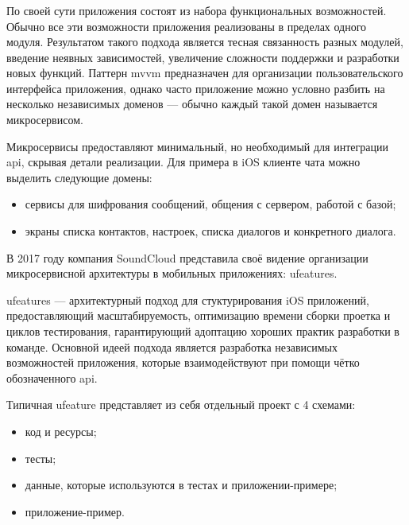 \subsubsection{}
\label{sec:analysis:research:mobArch:ufeature}

По своей сути приложения состоят из набора функциональных возможностей. Обычно все эти возможности приложения реализованы в пределах одного модуля. Результатом такого подхода является тесная связанность разных модулей, введение неявных зависимостей, увеличение сложности поддержки и разработки новых функций. Паттерн \gls{mvvm} предназначен для организации пользовательского интерфейса приложения, однако часто приложение можно условно разбить на несколько независимых доменов --- обычно каждый такой домен называется микросервисом.

Микросервисы предоставляют минимальный, но необходимый для интеграции \gls{api}, скрывая детали реализации. Для примера в iOS клиенте чата можно выделить следующие домены:

\begin{itemize}
	\item сервисы для шифрования сообщений, общения с сервером, работой с базой;
	\item экраны списка контактов, настроек, списка диалогов и конкретного диалога.
\end{itemize}

В 2017 году компания SoundCloud представила своё видение организации микросервисной архитектуры в мобильных приложениях: \glspl{ufeature}.

\glspl{ufeature} --- архитектурный подход для стуктурирования iOS приложений, предоставляющий масштабируемость, оптимизацию времени сборки проетка и циклов тестирования, гарантирующий адоптацию хороших практик разработки в команде. Основной идеей подхода является разработка независимых возможностей приложения, которые взаимодействуют при помощи чётко обозначенного \gls{api}\cite{soundcloud:ufeature}.

Типичная \gls{ufeature} представляет из себя отдельный проект с 4 схемами:

\begin{itemize}
	\item код и ресурсы;
	\item тесты;
	\item данные, которые используются в тестах и приложении-примере;
	\item приложение-пример.
\end{itemize}

